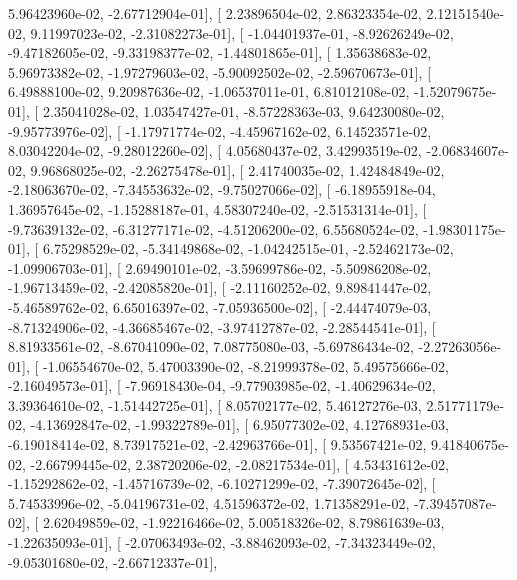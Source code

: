 \documentclass{article}
\begin{document}
          5.96423960e-02,  -2.67712904e-01],
       [  2.23896504e-02,   2.86323354e-02,   2.12151540e-02,
          9.11997023e-02,  -2.31082273e-01],
       [ -1.04401937e-01,  -8.92626249e-02,  -9.47182605e-02,
         -9.33198377e-02,  -1.44801865e-01],
       [  1.35638683e-02,   5.96973382e-02,  -1.97279603e-02,
         -5.90092502e-02,  -2.59670673e-01],
       [  6.49888100e-02,   9.20987636e-02,  -1.06537011e-01,
          6.81012108e-02,  -1.52079675e-01],
       [  2.35041028e-02,   1.03547427e-01,  -8.57228363e-03,
          9.64230080e-02,  -9.95773976e-02],
       [ -1.17971774e-02,  -4.45967162e-02,   6.14523571e-02,
          8.03042204e-02,  -9.28012260e-02],
       [  4.05680437e-02,   3.42993519e-02,  -2.06834607e-02,
          9.96868025e-02,  -2.26275478e-01],
       [  2.41740035e-02,   1.42484849e-02,  -2.18063670e-02,
         -7.34553632e-02,  -9.75027066e-02],
       [ -6.18955918e-04,   1.36957645e-02,  -1.15288187e-01,
          4.58307240e-02,  -2.51531314e-01],
       [ -9.73639132e-02,  -6.31277171e-02,  -4.51206200e-02,
          6.55680524e-02,  -1.98301175e-01],
       [  6.75298529e-02,  -5.34149868e-02,  -1.04242515e-01,
         -2.52462173e-02,  -1.09906703e-01],
       [  2.69490101e-02,  -3.59699786e-02,  -5.50986208e-02,
         -1.96713459e-02,  -2.42085820e-01],
       [ -2.11160252e-02,   9.89841447e-02,  -5.46589762e-02,
          6.65016397e-02,  -7.05936500e-02],
       [ -2.44474079e-03,  -8.71324906e-02,  -4.36685467e-02,
         -3.97412787e-02,  -2.28544541e-01],
       [  8.81933561e-02,  -8.67041090e-02,   7.08775080e-03,
         -5.69786434e-02,  -2.27263056e-01],
       [ -1.06554670e-02,   5.47003390e-02,  -8.21999378e-02,
          5.49575666e-02,  -2.16049573e-01],
       [ -7.96918430e-04,  -9.77903985e-02,  -1.40629634e-02,
          3.39364610e-02,  -1.51442725e-01],
       [  8.05702177e-02,   5.46127276e-03,   2.51771179e-02,
         -4.13692847e-02,  -1.99322789e-01],
       [  6.95077302e-02,   4.12768931e-03,  -6.19018414e-02,
          8.73917521e-02,  -2.42963766e-01],
       [  9.53567421e-02,   9.41840675e-02,  -2.66799445e-02,
          2.38720206e-02,  -2.08217534e-01],
       [  4.53431612e-02,  -1.15292862e-02,  -1.45716739e-02,
         -6.10271299e-02,  -7.39072645e-02],
       [  5.74533996e-02,  -5.04196731e-02,   4.51596372e-02,
          1.71358291e-02,  -7.39457087e-02],
       [  2.62049859e-02,  -1.92216466e-02,   5.00518326e-02,
          8.79861639e-03,  -1.22635093e-01],
       [ -2.07063493e-02,  -3.88462093e-02,  -7.34323449e-02,
         -9.05301680e-02,  -2.66712337e-01],
\end{document}
